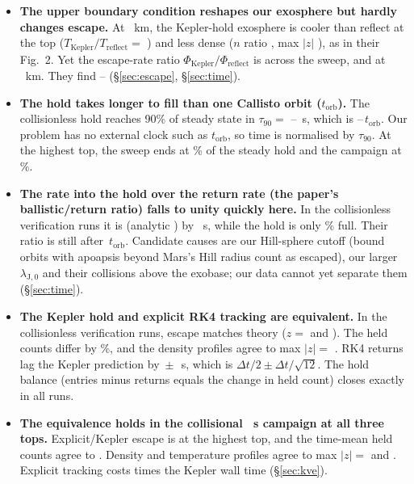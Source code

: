 \documentclass[10pt]{article}
\newcommand{\torb}{t_\mathrm{orb}}
\newcommand{\tauf}{\tau_{90}}
\begin{document}
\begin{tcolorbox}[enhanced, breakable, sharp corners, frame hidden, colback=white,
  borderline west={1.2pt}{0pt}{lightgrey}, left=12pt, right=2pt, top=2pt, bottom=2pt,
  before skip=6pt, after skip=4pt]
\begin{itemize}[leftmargin=1.1em, itemsep=3pt]
  \item \textbf{The upper boundary condition reshapes our exosphere but hardly changes escape.} At \profZtop{}~km, the Kepler-hold exosphere is cooler than reflect at the top ($T_\mathrm{Kepler}/T_\mathrm{reflect} = $ \TRatioKeplerTop{}) and less dense ($n$ ratio \nRatioKeplerTop{}, max $|z|$ \nZmaxKepler{}), as in their Fig.~2. Yet the escape-rate ratio $\Phi_\mathrm{Kepler}/\Phi_\mathrm{reflect}$ is \sweepPhiRatioRange{} across the sweep, and \sweepPhiRatioTop{} at \profZtop{}~km. They find \pPhiRatioStart{}–\pPhiRatioEnd{} (\S\ref{sec:escape}, \S\ref{sec:time}).
  \item \textbf{The hold takes longer to fill than one Callisto orbit ($\torb$).} The collisionless hold reaches 90\% of steady state in $\tauf = $ \tauFillLo{}–\tauFillHi{}~s, which is \tauFillLoOrb{}–\tauFillHiOrb{}\,$\torb$. Our problem has no external clock such as $\torb$, so time is normalised by $\tauf$. At the highest top, the sweep ends at \heldFracSweepEnd{}\% of the steady hold and the campaign at \heldFracCampEnd{}\%.
  \item \textbf{The rate into the hold over the return rate (the paper's ballistic/return ratio) falls to unity quickly here.} In the collisionless verification runs it is \verInRetKepler{} (analytic \anInRetVerEnd{}) by \verTend{}~s, while the hold is only \heldFracVerEnd{}\% full. Their ratio is still \pInRetEnd{} after \pFigThreeThi{}\,$\torb$. Candidate causes are our Hill-sphere cutoff (bound orbits with apoapsis beyond Mars's Hill radius count as escaped), our larger $\lambda_{\mathrm{J},0}$ and their collisions above the exobase; our data cannot yet separate them (\S\ref{sec:time}).
  \item \textbf{The Kepler hold and explicit RK4 tracking are equivalent.} In the collisionless verification runs, escape matches theory ($z = $ \verEscZKepler{} and \verEscZExplicit{}). The held counts differ by \verKvsEHeld{}\%, and the density profiles agree to max $|z| = $ \verKvsEZ{}. RK4 returns lag the Kepler prediction by \verDelayMean{}\,$\pm$\,\verDelayStd{}~s, which is $\Delta t/2 \pm \Delta t/\sqrt{12}$. The hold balance (entries minus returns equals the change in held count) closes exactly in all \verNHoldRuns{} runs.
  \item \textbf{The equivalence holds in the collisional \campTend{}~s campaign at all three tops.} Explicit/Kepler escape is \prodEscRatioTop{} at the highest top, and the time-mean held counts agree to \prodHeldRatioRange{}. Density and temperature profiles agree to max $|z| = $ \prodZmaxN{} and \prodZmaxT{}. Explicit tracking costs \prodWallRatioRange{} times the Kepler wall time (\S\ref{sec:kve}).

\end{itemize}
\end{tcolorbox}
\end{document}
